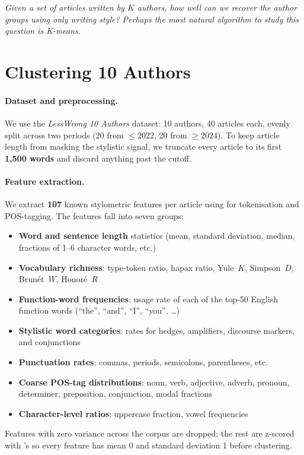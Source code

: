 \documentclass[11pt]{article}
\title{\vspace{-2.0em}{\color{accent}\textsf{\bfseries K-means Clustering for Authorship Stylometry}}}
\author{}
\date{}
\newcommand{\code}[1]{%
  \tcbox[on line, colback=codebg, colframe=codebg,
         boxrule=0pt, arc=2pt, left=2pt, right=2pt, top=0pt, bottom=0pt]
        {\ttfamily\small #1}}
\begin{document}
\maketitle
\vspace{-3.0em}

\noindent
\textit{Given a set of articles written by $K$ authors, how well can we recover
the author groups using only writing style? Perhaps the most natural algorithm
to study this question is K-means.}

\section{Clustering 10 Authors}

\paragraph{Dataset and preprocessing.}
We use the \textit{LessWrong 10 Authors} dataset: 10 authors, 40 articles
each, evenly split across two periods (20 from $\leq 2022$, 20 from
$\geq 2024$). To keep article length from masking the stylistic signal, we
truncate every article to its first \textbf{1{,}500 words} and discard
anything past the cutoff.

\paragraph{Feature extraction.}
We extract \textbf{107} known stylometric features per article using
\code{NLTK} for tokenisation and POS-tagging. The features fall into seven
groups:
\begin{itemize}\setlength\itemsep{1pt}
  \item \textbf{Word and sentence length} statistics (mean, standard deviation,
        median, fractions of 1--6 character words, etc.)
  \item \textbf{Vocabulary richness}: type-token ratio, hapax ratio, Yule~$K$,
        Simpson~$D$, Brunét~$W$, Honoré~$R$
  \item \textbf{Function-word frequencies}: usage rate of each of the top-50
        English function words (``the'', ``and'', ``I'', ``you'', \ldots)
  \item \textbf{Stylistic word categories}: rates for hedges, amplifiers,
        discourse markers, and conjunctions
  \item \textbf{Punctuation rates}: commas, periods, semicolons, parentheses, etc.
  \item \textbf{Coarse POS-tag distributions}: noun, verb, adjective, adverb,
        pronoun, determiner, preposition, conjunction, modal fractions
  \item \textbf{Character-level ratios}: uppercase fraction, vowel frequencies
\end{itemize}
Features with zero variance across the corpus are dropped; the rest are
z-scored with \code{sklearn}'s \code{StandardScaler} so every feature has mean
0 and standard deviation 1 before clustering.
\end{document}
